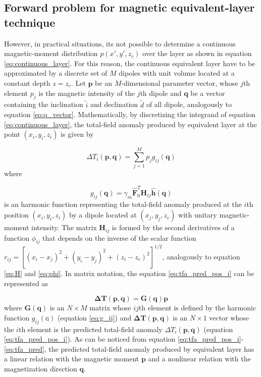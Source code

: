 \subsection{Forward problem for magnetic equivalent-layer technique}

However, in practical situations, its not possible to determine a continuous magnetic-moment distribution $p(x',y',z_c)$ over the layer as shown in equation \ref{eq:continuous_layer}. For this reason, the continuous equivalent layer have to be approximated  by a discrete set of $M$ dipoles with unit volume located at a constant depth $z = z_c$. Let $\mathbf{p}$ be an $M$-dimensional parameter vector, whose $j$th element $p_j$ is the magnetic intensity of the $j$th dipole and $\mathbf{q}$ be a vector containing the inclination $\tilde{i}$ and declination $\tilde{d}$ of all dipole, analogously to equation \ref{eq:q_vector}. Mathematically, by discretizing the integrand of equation \ref{eq:continuous_layer}, the total-field anomaly produced by equivalent layer at the point $(x_i,y_i,z_i)$ is given by     

\begin{equation}
\Delta T_i (\mathbf{p},\mathbf{q}) = \sum_{j=1}^{M} p_j g_{ij} (\mathbf{q})
\label{eq:tfa_pred_pos_i}
\end{equation}    
where 

\begin{equation}
g_{ij} (\mathbf{q})  = \gamma_m \hat{\mathbf{F}}_0^T \mathbf{H}_{ij} \hat{\mathbf{h}}(\mathbf{q})
\label{eq:g_ij}
\end{equation}
is an harmonic function representing the total-field anomaly produced at the $i$th position $(x_i,y_i,z_i)$ by a dipole located at $(x_j,y_j,z_c)$ with unitary magnetic-moment intensity. The matrix $\mathbf{H}_{ij}$ is formed by the second derivatives of a function $\phi_{ij}$ that depends on the inverse of the scalar function $r_{ij} = [(x_i-x_j)^2 + (y_i-y_j)^2 + (z_i-z_c)^2]^{1/2}$, analogously to equation \ref{eq:H} and \ref{eq:phi}. In matrix notation, the equation \ref{eq:tfa_pred_pos_i} can be represented as 

\begin{equation}
 \mathbf{\Delta T} (\mathbf{p}, \mathbf{q}) = \mathbf{G}(\mathbf{q}) \mathbf{p}
\label{eq:tfa_pred}
\end{equation}
where $\mathbf{G}(\mathbf{q})$ is an $N \times M$ matrix whose $ij$th element is defined by the harmonic function $g_{ij}(\mathbb{q})$ (equation \ref{eq:g_ij}) and $\mathbf{\Delta T} (\mathbf{p}, \mathbf{q})$ is an $N \times 1$ vector whose the $i$th element is the predicted total-field anomaly $\Delta T_i (\mathbf{p},\mathbf{q})$ (equation \ref{eq:tfa_pred_pos_i}). As can be noticed from equation \ref{eq:tfa_pred_pos_i}-\ref{eq:tfa_pred}, the predicted total-field anomaly produced by equivalent layer has a linear relation with the magnetic moment $\mathbf{p}$ and a nonlinear relation with the magnetization direction $\mathbf{q}$. 

